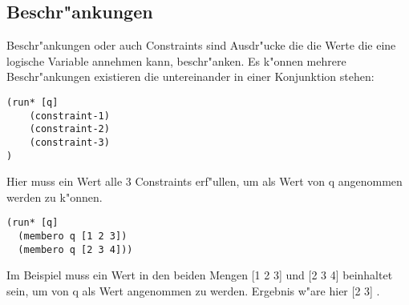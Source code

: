 \subsection{Beschr"ankungen}

Beschr"ankungen oder auch Constraints sind Ausdr"ucke die die Werte die eine logische Variable annehmen kann, beschr"anken. Es k"onnen mehrere Beschr"ankungen existieren die untereinander in einer Konjunktion stehen:
\begin{lstlisting}
(run* [q]
    (constraint-1)
    (constraint-2)
    (constraint-3)
)
\end{lstlisting}

Hier muss ein Wert alle 3 Constraints erf"ullen, um als Wert von q angenommen werden zu k"onnen.
\begin{lstlisting}
(run* [q]
  (membero q [1 2 3])
  (membero q [2 3 4]))
\end{lstlisting}

Im Beispiel muss ein Wert in den beiden Mengen [1 2 3] und [2 3 4] beinhaltet sein, um von q als Wert angenommen zu werden. Ergebnis w"are hier [2 3] .

